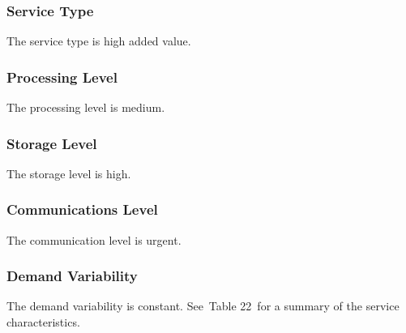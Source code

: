 \documentclass[a4paper]{article}
\begin{document}
\subsubsection[Service Type]{ Service Type}
\hypertarget{Toc381777310}{}{
The service type is high added value.}

\subsubsection[Processing Level]{ Processing
Level}
\hypertarget{Toc381777311}{}{
The processing level is medium.}

\subsubsection[Storage Level]{ Storage Level}
\hypertarget{Toc381777312}{}{
The storage level is high.}

\subsubsection[Communications Level]{
Communications Level}
\hypertarget{Toc381777313}{}{
The communication level is urgent.}

\subsubsection[Demand Variability]{ Demand
Variability}
\hypertarget{Toc381777314}{}\foreignlanguage{english}{The demand
variability is constant. See\ }Table 22\foreignlanguage{english}{\ for
a summary of the service characteristics.}


\bigskip


\bigskip

\end{document}
